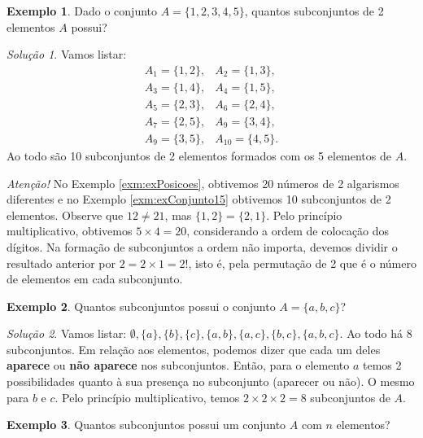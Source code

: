 \documentclass[]{book}
\theoremstyle{definition}
\theoremstyle{definition}
\newtheorem{example}{Exemplo}[chapter]
\theoremstyle{definition}
\theoremstyle{remark}
\newtheorem*{solution}{Solução}
\begin{document}
\begin{example}
\protect\hypertarget{exm:exConjunto15}{}{\label{exm:exConjunto15} }Dado o conjunto \(A = \{1,2,3,4,5\}\), quantos subconjuntos de 2 elementos \(A\) possui?
\end{example}

\begin{solution}
\iffalse{} {Solução. } \fi{}Vamos listar:
\[
  \left.\begin{matrix}
A_1 = \{1,2\}, & A_2 = \{1,3\},\\ 
A_3 = \{1,4\}, & A_4 = \{1,5\},\\ 
A_5 = \{2,3\}, & A_6 = \{2,4\},\\ 
A_7 = \{2,5\}, & A_9 = \{3,4\},\\ 
A_9 = \{3,5\}, & A_{10} = \{4,5\}. 
\end{matrix}\right.
\]
Ao todo são 10 subconjuntos de 2 elementos formados com os 5 elementos de \(A\).
\end{solution}

\emph{Atenção!} No Exemplo \ref{exm:exPosicoes}, obtivemos 20 números de 2 algarismos diferentes e no Exemplo \ref{exm:exConjunto15} obtivemos 10 subconjuntos de 2 elementos.
Observe que \(12 \neq 21\), mas \(\{1,2\}=\{2,1\}\).
Pelo princípio multiplicativo, obtivemos \(5\times 4=20\), considerando a ordem de colocação dos dígitos.
Na formação de subconjuntos a ordem não importa, devemos dividir o resultado anterior por \(2 = 2\times 1 = 2!\), isto é, pela permutação de 2 que é o número de elementos em cada subconjunto.

\begin{example}
\protect\hypertarget{exm:unnamed-chunk-28}{}{\label{exm:unnamed-chunk-28} }Quantos subconjuntos possui o conjunto \(A = \{a,b,c\}\)?
\end{example}

\begin{solution}
\iffalse{} {Solução. } \fi{}Vamos listar: \(\emptyset, \{a\}, \{b\}, \{c\}, \{a,b\}, \{a,c\}, \{b,c\}, \{a,b,c\}\).
Ao todo há 8 subconjuntos.
Em relação aos elementos, podemos dizer que cada um deles \textbf{aparece} ou \textbf{não aparece} nos subconjuntos.
Então, para o elemento \(a\) temos 2 possibilidades quanto à sua presença no subconjunto (aparecer ou não).
O mesmo para \(b\) e \(c\).
Pelo princípio multiplicativo, temos \(2 \times 2 \times 2 = 8\) subconjuntos de \(A\).
\end{solution}

\begin{example}
\protect\hypertarget{exm:unnamed-chunk-30}{}{\label{exm:unnamed-chunk-30} }Quantos subconjuntos possui um conjunto \(A\) com \(n\) elementos?
\end{example}
\end{document}
